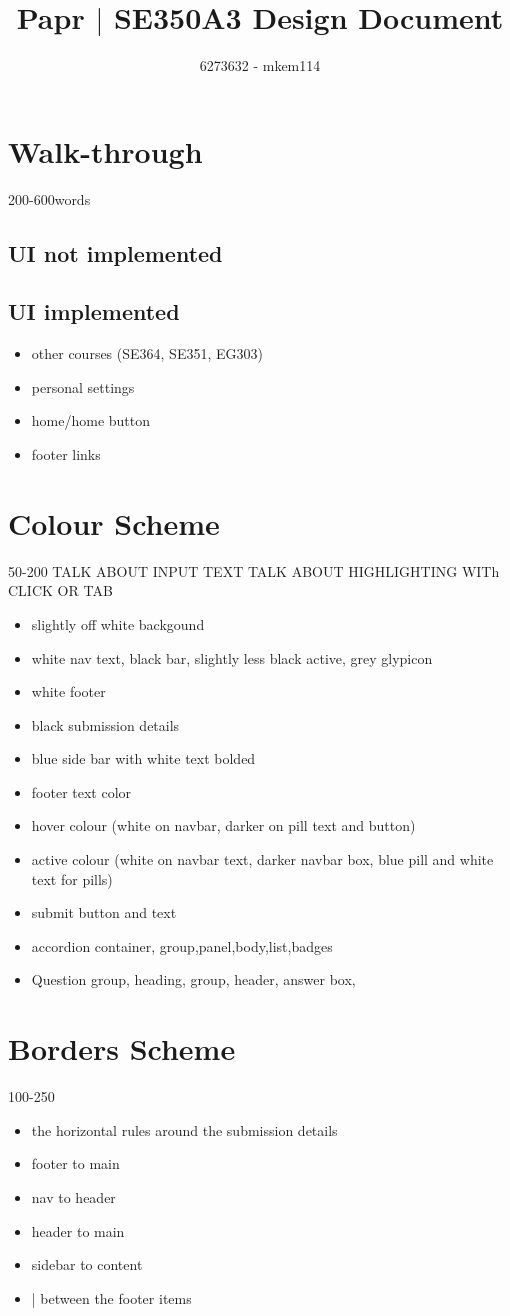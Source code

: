 \documentclass[10pt,a4paper]{article}
\author{6273632 - mkem114}
\title{Papr $|$ SE350A3 Design Document}
\begin{document}
\maketitle
\section{Walk-through}
200-600words
\subsection{UI not implemented}
\subsection{UI implemented}
\begin{itemize}
	\item other courses (SE364, SE351, EG303)
	\item personal settings
	\item home/home button
	\item footer links
\end{itemize}
\section{Colour Scheme}
50-200
TALK ABOUT INPUT TEXT
TALK ABOUT HIGHLIGHTING WITh CLICK OR TAB
\begin{itemize}
	\item slightly off white backgound
	\item white nav text, black bar, slightly less black active, grey glypicon
	\item white footer
	\item black submission details
	\item blue side bar with white text bolded
	\item footer text color
	\item hover colour (white on navbar, darker on pill text and button)
	\item active colour (white on navbar text, darker navbar box, blue pill and white text for pills)
	\item submit button and text
	\item accordion container, group,panel,body,list,badges
	\item Question group, heading, group, header, answer box, 
\end{itemize}
\section{Borders Scheme}
100-250
\begin{itemize}
	\item the horizontal rules around the submission details
	\item footer to main
	\item nav to header
	\item header to main
	\item sidebar to content
	\item | between the footer items
\end{itemize}
\end{document}
